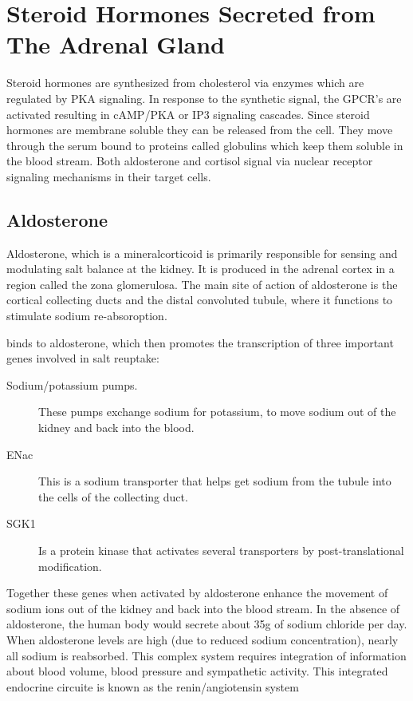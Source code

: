 \documentclass{tufte-handout}
\begin{document}
\section{Steroid Hormones Secreted from The Adrenal Gland}

Steroid hormones are synthesized from cholesterol via enzymes which are regulated by PKA signaling.  In response to the synthetic signal, the GPCR's are activated resulting in cAMP/PKA or IP3 signaling cascades.  Since steroid hormones are membrane soluble they can be released from the cell.  They move through the serum bound to proteins called globulins which keep them soluble in the blood stream.  Both aldosterone and cortisol signal via nuclear receptor signaling mechanisms in their target cells.

\subsection{Aldosterone}

Aldosterone, which is a mineralcorticoid is primarily responsible for sensing and modulating salt balance at the kidney.  It is produced in the adrenal cortex in a region called the zona glomerulosa.  The main site of action of aldosterone is the cortical collecting ducts and the distal convoluted tubule, where it functions to stimulate sodium re-absoroption.  

 binds to aldosterone, which then promotes the transcription of three important genes involved in salt reuptake:

\begin{description}
 \item[Sodium/potassium pumps.]  These pumps exchange sodium for potassium, to move sodium out of the kidney and back into the blood.
 \item[ENac] This is a sodium transporter that helps get sodium from the tubule into the cells of the collecting duct.
 \item[SGK1] Is a protein kinase that activates several transporters by post-translational modification.
\end{description}

Together these genes when activated by aldosterone enhance the movement of sodium ions out of the kidney and back into the blood stream.  In the absence of aldosterone, the human body would secrete about 35g of sodium chloride per day.  When aldosterone levels are high (due to reduced sodium concentration), nearly all sodium is reabsorbed.  This complex system requires integration of information about blood volume, blood pressure and sympathetic activity.  This integrated endocrine circuite is known as the renin/angiotensin system
\end{document}
